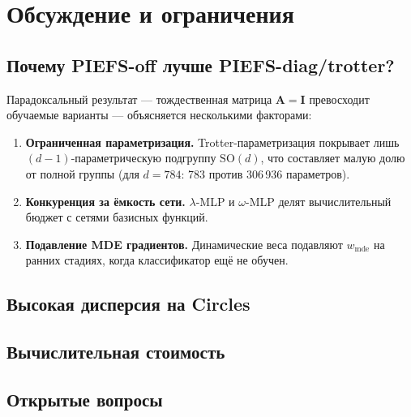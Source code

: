 \documentclass[14pt, a4paper, oneside]{extreport}
\theoremstyle{plain}
\theoremstyle{definition}
\begin{document}

\chapter{Обсуждение и ограничения}
\label{ch:discussion}

\section{Почему PIEFS-off лучше PIEFS-diag/trotter?}

Парадоксальный результат — тождественная матрица $\mathbf{A} = \mathbf{I}$ превосходит обучаемые варианты — объясняется несколькими факторами:

\begin{enumerate}
  \item \textbf{Ограниченная параметризация.} Trotter-параметризация покрывает лишь $(d{-}1)$-параметрическую подгруппу $\mathrm{SO}(d)$, что составляет малую долю от полной группы (для $d=784$: 783 против 306\,936 параметров).
  \item \textbf{Конкуренция за ёмкость сети.} $\lambda$-MLP и $\omega$-MLP делят вычислительный бюджет с сетями базисных функций.
  \item \textbf{Подавление MDE градиентов.} Динамические веса подавляют $w_{\text{mde}}$ на ранних стадиях, когда классификатор ещё не обучен.
\end{enumerate}

\section{Высокая дисперсия на Circles}


\section{Вычислительная стоимость}


\section{Открытые вопросы}

\end{document}
